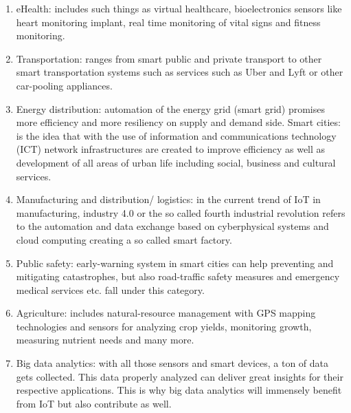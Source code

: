			\begin{enumerate}

			\item eHealth:  includes such things as virtual healthcare, bioelectronics sensors  like heart monitoring implant, real time monitoring of vital signs and fitness monitoring. 
			\item Transportation:  ranges from smart public and private transport to other smart transportation systems such as services such as Uber and Lyft or other car-pooling appliances. 
			\item Energy distribution: automation of the energy grid (smart grid) promises more efficiency and more resiliency on supply and demand side. Smart cities: is the idea that with the use of information and communications technology (ICT) network infrastructures are created to improve efficiency as well as development of all areas of urban life including social, business and cultural services. 
			\item Manufacturing and distribution/ logistics: in the current trend of IoT in manufacturing, industry 4.0 or the so called fourth industrial revolution refers to the automation and data exchange based on cyberphysical systems and cloud computing creating a so called smart factory.
			\item Public safety: early-warning system in smart cities can help preventing and mitigating catastrophes, but also road-traffic safety measures and emergency medical services etc. fall under this category.
			\item Agriculture: includes natural-resource management with GPS mapping technologies and sensors for analyzing crop yields, monitoring growth, measuring nutrient needs and many more. 
			\item Big data analytics: with all those sensors and smart devices, a ton of data gets collected. This data properly analyzed can deliver great insights for their respective applications. This is why big data analytics will immensely benefit from IoT but also contribute as well.

			\end{enumerate}

